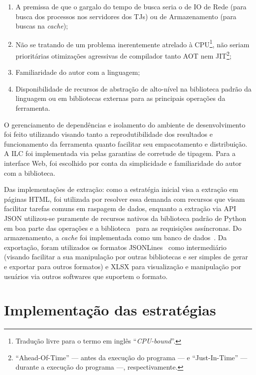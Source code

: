 \begin{enumerate}
    \item A premissa de que o gargalo do tempo de busca seria o de IO de Rede
        (para busca dos processos nos servidores dos TJs) ou de Armazenamento
        (para buscas na \textit{cache});
    \item Não se tratando de um problema inerentemente atrelado à
        CPU\footnote{Tradução livre para o termo em inglês
        ``\textit{CPU-bound}''.}, não seriam prioritárias otimizações
        agressivas de compilador tanto AOT nem JIT\footnote{``Ahead-Of-Time''
        --- antes da execução do programa --- e ``Just-In-Time'' --- durante a
        execução do programa ---, respectivamente.};
    \item Familiaridade do autor com a linguagem;
    \item Disponibilidade de recursos de abstração de alto-nível na biblioteca
        padrão da linguagem ou em bibliotecas externas para as principais
        operações da ferramenta.
\end{enumerate}

O gerenciamento de dependências e isolamento do ambiente de desenvolvimento foi
feito utilizando \cite{about:poetry} visando tanto a reprodutibilidade dos
resultados e funcionamento da ferramenta quanto facilitar seu empacotamento e
distribuição. A ILC foi implementada via \cite{about:typer} pelas garantias de
corretude de tipagem. Para a interface Web, foi escolhido \cite{about:flask}
por conta da simplicidade e familiaridade do autor com a biblioteca.

Das implementações de extração: como a estratégia inicial visa a extração em
páginas HTML, \cite{lib:scrapy} foi utilizada por resolver essa demanda com
recursos que visam facilitar tarefas comuns em raspagem de dados, enquanto a
extração via API JSON utilizou-se puramente de recursos nativos da biblioteca
padrão de Python em boa parte das operações e a biblioteca~\cite{lib:aiohttp}
para as requisições assíncronas. Do armazenamento, a \textit{cache} foi
implementada como um banco de dados~\cite{tool:sqlite}. Da exportação, foram
utilizados os formatos JSONLines~\cite{spec:jsonlines} como intermediário
(visando facilitar a sua manipulação por outras bibliotecas e ser simples de
gerar e exportar para outros formatos) e XLSX para visualização e manipulação
por usuários via outros softwares que suportem o formato.


\section{Implementação das estratégias}

